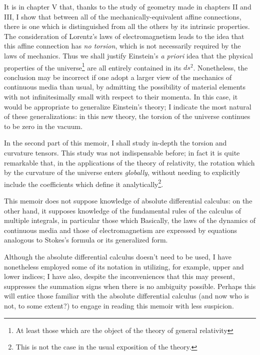\documentclass{report}
\begin{document}
It is in chapter V that, thanks to the study of geometry made in chapters II and III, I show that between all of the mechanically-equivalent affine connections, there is one which is distinguished from all the others by its intrinsic properties. The consideration of Lorentz's laws of electromagnetism leads to the idea that this affine connection has \textit{no torsion}, which is not necessarily required by the laws of mechanics. Thus we shall justify Einstein's \textit{a priori} idea that the physical properties of the universe\footnote{At least those which are the object of the theory of general relativity} are all entirely contained in its $ds^2$. Nonetheless, the conclusion may be incorrect if one adopt a larger view of the mechanics of continuous media than usual, by admitting the possibility of material elements with  not infinitesimally small with respect to their momenta. In this case, it would be appropriate to generalize Einstein's theory; I indicate the most natural of these generalizations: in this new theory, the torsion of the universe continues to be zero in the vacuum.

In the second part of this memoir, I shall study in-depth the torsion and curvature tensors. This study was not indispensable before; in fact it is quite remarkable that, in the applications of the theory of relativity, the rotation which  by the curvature of the universe enters \textit{globally}, without needing to explicitly include the coefficients which define it analytically\footnote{This is not the case in the usual exposition of the theory.}.

This memoir does not suppose knowledge of absolute differential calculus: on the other hand, it supposes knowledge of the fundamental rules of the calculus of multiple integrals, in particular those which  Basically, the laws of the dynamics of continuous media and those of electromagnetism are expressed by equations analogous to Stokes's formula or its generalized form.

Although the absolute differential calculus doesn't need to be used, I have nonetheless employed some of its notation in utilizing, for example, upper and lower indices; I have also, despite the inconveniences that this may present, suppresses the summation signs when there is no ambiguity possible. Perhaps this will entice those familiar with the absolute differential calculus (and now who is not, to some extent?) to engage in reading this memoir with less suspicion.
\end{document}
